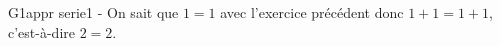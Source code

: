   G1appr serie1 - On sait que $1=1$ avec l’exercice précédent donc $1+1=1+1$,
  c’est-à-dire $2=2$.
